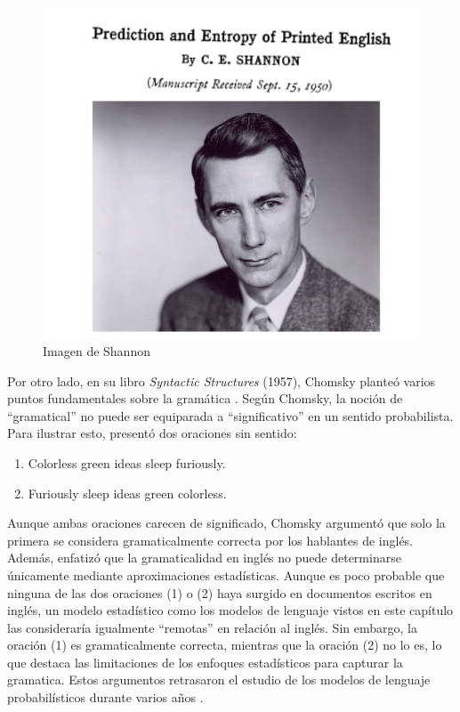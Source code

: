 \begin{figure}[h]
    \centering
    \includegraphics[scale = 0.4]{pics/shannon.png}
    \caption{Imagen de Shannon}
\end{figure}

Por otro lado, en su libro \textit{Syntactic Structures} (1957), Chomsky planteó varios puntos fundamentales sobre la gramática \cite{chomsky2009syntactic}. Según Chomsky, la noción de ``gramatical'' no puede ser equiparada a ``significativo'' en un sentido probabilista. Para ilustrar esto, presentó dos oraciones sin sentido:

\begin{enumerate}
    \item Colorless green ideas sleep furiously.
    \item Furiously sleep ideas green colorless.
\end{enumerate}

Aunque ambas oraciones carecen de significado, Chomsky argumentó que solo la primera se considera gramaticalmente correcta por los hablantes de inglés. Además, enfatizó que la gramaticalidad en inglés no puede determinarse únicamente mediante aproximaciones estadísticas. Aunque es poco probable que ninguna de las dos oraciones (1) o (2) haya surgido en documentos escritos en inglés, un modelo estadístico como los modelos de lenguaje vistos en este capítulo las consideraría igualmente ``remotas'' en relación al inglés. Sin embargo, la oración (1) es gramaticalmente correcta, mientras que la oración (2) no lo es, lo que destaca las limitaciones de los enfoques estadísticos para capturar la gramatica. Estos argumentos retrasaron el estudio de los modelos de lenguaje probabilísticos durante varios años \cite{JurafskyBook}.

